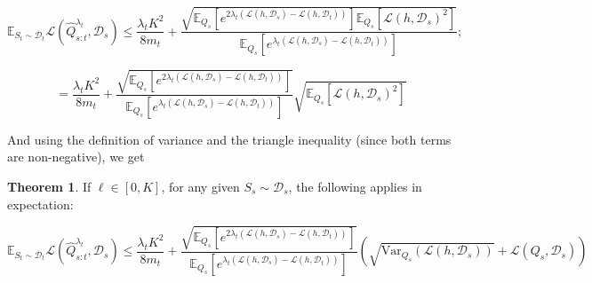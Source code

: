 \documentclass[letterpaper]{article}
\theoremstyle{definition}
\newtheorem{theorem}{Theorem}
\begin{document}
$$
\mathbb{E}_{S_t\sim \mathcal{D}_t}\mathcal{L}( \hat{Q}^{\lambda_t}_{s:t},\mathcal{D}_s)\leq \frac{\lambda_t K^2}{8m_t}+\frac{\sqrt{\mathbb{E}_{Q_s}\left [e^{2\lambda_t(\mathcal{L}(h,\mathcal{D}_s)-\mathcal{L}(h,\mathcal{D}_t))}\right ]\mathbb{E}_{Q_s}\left [\mathcal{L}(h,\mathcal{D}_s)^2 \right ]}}{\mathbb{E}_{Q_s}\left [e^{\lambda_t(\mathcal{L}(h,\mathcal{D}_s)-\mathcal{L}(h,\mathcal{D}_t))}\right ]};
$$

\begin{equation} \label{eq:oracle-CS-opt}
=\frac{\lambda_t K^2}{8m_t}+\frac{\sqrt{\mathbb{E}_{Q_s}\left [e^{2\lambda_t(\mathcal{L}(h,\mathcal{D}_s)-\mathcal{L}(h,\mathcal{D}_t))}\right ]}}{\mathbb{E}_{Q_s}\left [e^{\lambda_t(\mathcal{L}(h,\mathcal{D}_s)-\mathcal{L}(h,\mathcal{D}_t))}\right ]}\sqrt{\mathbb{E}_{Q_s}\left [\mathcal{L}(h,\mathcal{D}_s)^2 \right ]}
\end{equation}

And using the definition of variance and the triangle inequality (since both terms are non-negative), we get

\begin{theorem}
If $\ell\in[0,K]$, for any given $S_s\sim \mathcal{D}_s$, the following applies in expectation:   

\begin{equation} \label{eq:oracle-final}
\mathbb{E}_{S_t\sim \mathcal{D}_t}\mathcal{L}( \hat{Q}^{\lambda_t}_{s:t},\mathcal{D}_s)\leq \frac{\lambda_t K^2}{8m_t}+\frac{\sqrt{\mathbb{E}_{Q_s}\left [e^{2\lambda_t(\mathcal{L}(h,\mathcal{D}_s)-\mathcal{L}(h,\mathcal{D}_t))}\right ]}}{\mathbb{E}_{Q_s}\left [e^{\lambda_t(\mathcal{L}(h,\mathcal{D}_s)-\mathcal{L}(h,\mathcal{D}_t))}\right ]}(\sqrt{\mathrm{Var}_{Q_s}(\mathcal{L}(h,\mathcal{D}_s))}+\mathcal{L}(Q_s,\mathcal{D}_s))
\end{equation}
\end{theorem}
\end{document}
